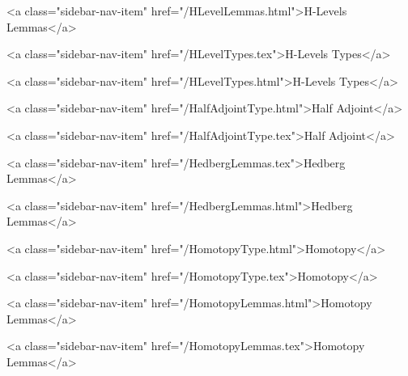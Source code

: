       
        
          <a class="sidebar-nav-item" href="/HLevelLemmas.html">H-Levels Lemmas</a>
        
      
    
      
        
          <a class="sidebar-nav-item" href="/HLevelTypes.tex">H-Levels Types</a>
        
      
    
      
        
          <a class="sidebar-nav-item" href="/HLevelTypes.html">H-Levels Types</a>
        
      
    
      
        
          <a class="sidebar-nav-item" href="/HalfAdjointType.html">Half Adjoint</a>
        
      
    
      
        
          <a class="sidebar-nav-item" href="/HalfAdjointType.tex">Half Adjoint</a>
        
      
    
      
        
          <a class="sidebar-nav-item" href="/HedbergLemmas.tex">Hedberg Lemmas</a>
        
      
    
      
        
          <a class="sidebar-nav-item" href="/HedbergLemmas.html">Hedberg Lemmas</a>
        
      
    
      
        
          <a class="sidebar-nav-item" href="/HomotopyType.html">Homotopy</a>
        
      
    
      
        
          <a class="sidebar-nav-item" href="/HomotopyType.tex">Homotopy</a>
        
      
    
      
        
          <a class="sidebar-nav-item" href="/HomotopyLemmas.html">Homotopy Lemmas</a>
        
      
    
      
        
          <a class="sidebar-nav-item" href="/HomotopyLemmas.tex">Homotopy Lemmas</a>
        
      
    
